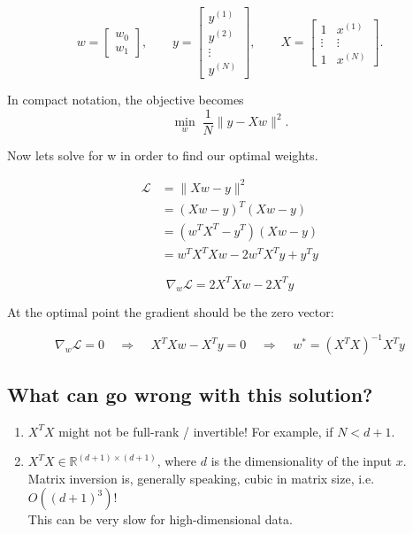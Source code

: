 \documentclass[11pt]{article}
\begin{document}
\[
	w =
	\begin{bmatrix}
		w_0 \\ w_1
	\end{bmatrix},
	\qquad
	y =
	\begin{bmatrix}
		y^{(1)} \\ y^{(2)} \\ \vdots \\ y^{(N)}
	\end{bmatrix},
	\qquad
	X =
	\begin{bmatrix}
		1      & x^{(1)} \\
		\vdots & \vdots  \\
		1      & x^{(N)}
	\end{bmatrix}.
\]

In compact notation, the objective becomes
\[
	\min_{w} \; \frac{1}{N} \|y - Xw\|^2.
\]

Now lets solve for w in order to find our optimal weights.

\begin{align*}
	\mathcal{L} & = \|Xw - y\|^2                      \\
	            & = (Xw - y)^T (Xw - y)               \\
	            & = (w^T X^T - y^T)(Xw - y)           \\
	            & = w^T X^T X w - 2 w^T X^T y + y^T y
\end{align*}

\[
	\nabla_w \mathcal{L} = 2X^T X w - 2X^T y
\]

At the optimal point the gradient should be the zero vector:

\[
	\nabla_w \mathcal{L} = 0 \;\;\;\;\Rightarrow\;\;\;\; X^T X w - X^T y = 0
	\;\;\;\;\Rightarrow\;\;\;\; w^* = (X^T X)^{-1} X^T y
\]


\subsection*{What can go wrong with this solution?}
\begin{enumerate}
	\item $X^T X$ might not be full-rank / invertible! For example, if $N < d+1$.
	\item $X^T X \in \mathbb{R}^{(d+1) \times (d+1)}$, where $d$ is the dimensionality of the input $x$. \\
	      Matrix inversion is, generally speaking, cubic in matrix size, i.e.\ $O((d+1)^3)$! \\
	      This can be very slow for high-dimensional data.
\end{enumerate}
\end{document}
